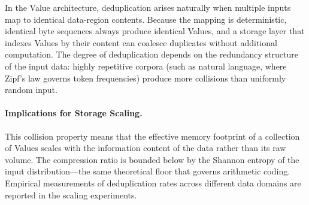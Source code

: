 In the Value architecture, deduplication arises naturally when multiple
inputs map to identical data-region contents.  Because the mapping is
deterministic, identical byte sequences always produce identical Values,
and a storage layer that indexes Values by their content can coalesce
duplicates without additional computation.  The degree of deduplication
depends on the redundancy structure of the input data: highly repetitive
corpora (such as natural language, where Zipf's law governs token
frequencies) produce more collisions than uniformly random input.

\paragraph{Implications for Storage Scaling.}
This collision property means that the effective memory footprint of a
collection of Values scales with the information content of the data
rather than its raw volume.  The compression ratio is bounded below by
the Shannon entropy of the input distribution---the same theoretical
floor that governs arithmetic coding.  Empirical measurements of
deduplication rates across different data domains are reported in the
scaling experiments.
